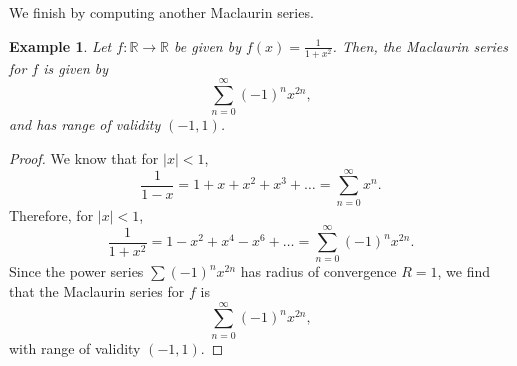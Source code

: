 \documentclass[a4paper, openany]{memoir}
\theoremstyle{definition}
\theoremstyle{plain}
\newtheorem{example}[definition]{Example}
\begin{document}
\noindent We finish by computing another Maclaurin series.
\begin{example}
Let $f: \mathbb{R} \to \mathbb{R}$ be given by $f(x) = \frac{1}{1 + x^2}$. Then, the Maclaurin series for $f$ is given by
\[\sum_{n=0}^\infty (-1)^n x^{2n},\]
and has range of validity $(-1, 1)$.
\end{example}
\begin{proof}
We know that for $|x| < 1$,
\[\frac{1}{1 - x} = 1 + x + x^2 + x^3 + \dots = \sum_{n=0}^{\infty} x^n.\]
Therefore, for $|x| < 1$,
\[\frac{1}{1 + x^2} = 1 - x^2 + x^4 - x^6 + \dots = \sum_{n=0}^{\infty} (-1)^n x^{2n}.\]
Since the power series $\sum (-1)^n x^{2n}$ has radius of convergence $R = 1$, we find that the Maclaurin series for $f$ is
\[\sum_{n=0}^\infty (-1)^n x^{2n},\]
with range of validity $(-1, 1)$.
\end{proof}
\end{document}

